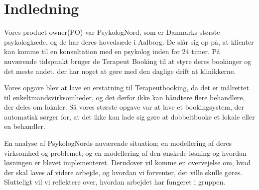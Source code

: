 \section{Indledning}
Vores product owner(PO) var PsykologNord, som er Danmarks største psykologkæde, og de har deres hovedsæde i Aalborg.
De slår sig op på, at klienter kan komme til en konsultation med en psykolog inden for 24 timer.
På nuværende tidspunkt bruger de Terapeut Booking til at styre deres bookinger og det meste andet, der har noget at gøre med den daglige drift at klinikkerne.

Vores opgave blev at lave en erstatning til Terapeutbooking, da det er målrettet til enkeltmandsvirksomheder, og det derfor ikke kan håndtere flere behandlere, der deles om lokaler.
Så vores største opgave var at lave et bookingsystem, der automatisk sørger for, at det ikke kan lade sig gøre at dobbeltbooke et lokale eller en behandler.

En analyse af PsykologNords nuværende situation;
en modellering af deres virksomhed og problemet;
og en modellering af den ønskede løsning og hvordan løsningen er blevet implementeret.
Derudover vil komme en overvejelse om, hvad der skal laves af videre arbejde, og hvordan vi forventer, det ville skulle gøres.
Slutteligt vil vi reflektere over, hvordan arbejdet har fungeret i gruppen.

\newpage